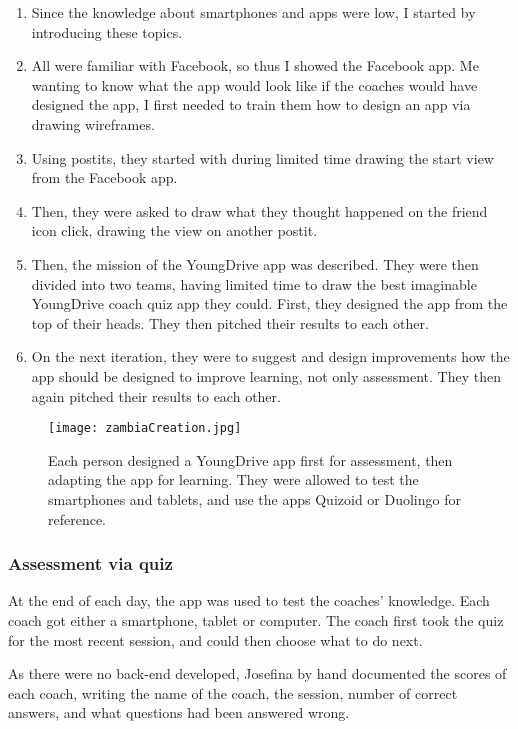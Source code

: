 \begin{enumerate}
\item Since the knowledge about smartphones and apps were low, I started by introducing these topics.
\item All were familiar with Facebook, so thus I showed the Facebook app. Me wanting to know what the app would look like if the coaches would have designed the app, I first needed to train them how to design an app via drawing wireframes.
\item Using postits, they started with during limited time drawing the start view from the Facebook app.
\item Then, they were asked to draw what they thought happened on the friend icon click, drawing the view on another postit.
\item Then, the mission of the YoungDrive app was described. They were then divided into two teams, having limited time to draw the best imaginable YoungDrive coach quiz app they could. First, they designed the app from the top of their heads. They then pitched their results to each other.
\item On the next iteration, they were to suggest and design improvements how the app should be designed to improve learning, not only assessment. They then again pitched their results to each other.
\end{enumerate}

\begin{figure}[h]
    \centering
    \texttt{[image: zambiaCreation.jpg]}
    \caption{Each person designed a YoungDrive app first for assessment, then adapting the app for learning. They were allowed to test the smartphones and tablets, and use the apps Quizoid or Duolingo for reference.}
    \label{fig:iteration}
\end{figure}

\subsubsection{Assessment via quiz}
At the end of each day, the app was used to test the coaches' knowledge. Each coach got either a smartphone, tablet or computer. The coach first took the quiz for the most recent session, and could then choose what to do next.

As there were no back-end developed, Josefina by hand documented the scores of each coach, writing the name of the coach, the session, number of correct answers, and what questions had been answered wrong.

